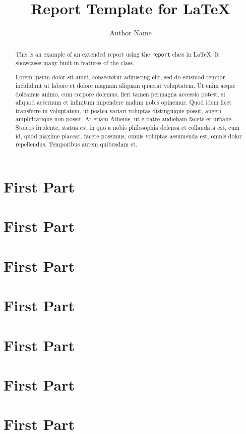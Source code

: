 \documentclass{report}
\title{Report Template for \LaTeX}
\author{Author Name}
\begin{document}
\maketitle

\begin{abstract}
  This is an example of an extended report using the \texttt{report} class in LaTeX. It showcases many built-in features of the class.
\end{abstract}

\tableofcontents

\begin{abstract}
  Lorem ipsum dolor sit amet, consectetur adipiscing elit, sed do eiusmod tempor
  incididunt ut labore et dolore magnam aliquam quaerat voluptatem. Ut enim
  aeque doleamus animo, cum corpore dolemus, fieri tamen permagna accessio
  potest, si aliquod aeternum et infinitum impendere malum nobis opinemur.
  Quod idem licet transferre in voluptatem, ut postea variari voluptas distinguique
  possit, augeri amplificarique non possit. At etiam Athenis, ut e patre audiebam
  facete et urbane Stoicos irridente, statua est in quo a nobis philosophia defensa
  et collaudata est, cum id, quod maxime placeat, facere possimus, omnis voluptas
  assumenda est, omnis dolor repellendus. Temporibus autem quibusdam et.
\end{abstract}

\layout%

\part{First Part}
\part{First Part}
\part{First Part}
\part{First Part}
\part{First Part}
\part{First Part}
\part{First Part}
\end{document}
